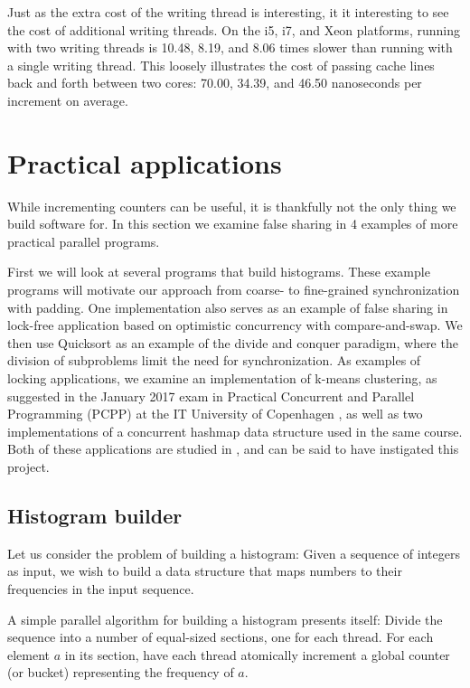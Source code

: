 Just as the extra cost of the writing thread is interesting, it it interesting
to see the cost of additional writing threads. On the i5, i7, and Xeon
platforms, running with two writing threads is 10.48, 8.19, and 8.06 times
slower than running with a single writing thread. This loosely illustrates the
cost of passing cache lines back and forth between two cores: 70.00, 34.39, and
46.50 nanoseconds per increment on average.

\section{Practical applications}
\label{sec:practical}
While incrementing counters can be useful, it is thankfully not the only thing we
build software for.
In this section we examine false sharing in 4 examples of more practical
parallel programs.

First we will look at several programs that build histograms. These example
programs will motivate our approach from coarse- to fine-grained synchronization
with padding. One implementation also serves as an example of false sharing in
lock-free application based on optimistic concurrency with compare-and-swap. We then use Quicksort as an example of the
divide and conquer paradigm, where the division of subproblems limit the need
for synchronization.
As examples of locking applications, we examine an implementation of k-means
clustering, as suggested in the January 2017 exam in Practical Concurrent and
Parallel Programming (PCPP) at the IT University of Copenhagen \cite{kmeansexam,
kmeansexamcode}, as well as two implementations of a concurrent hashmap data structure
used in the same course. Both of these applications are studied in
\cite{mystery}, and can be said to have instigated this project.

\subsection{Histogram builder}

Let us consider the problem of building a histogram: Given a sequence of
integers as input, we wish to build a data structure that maps numbers to their
frequencies in the input sequence.

A simple parallel algorithm for building a histogram presents itself: Divide the
sequence into a number of equal-sized sections, one for each thread. For each
element $a$ in its section, have each thread atomically increment a global
counter (or bucket) representing the frequency of $a$.

